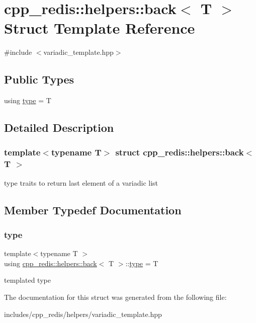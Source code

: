 \hypertarget{structcpp__redis_1_1helpers_1_1back_3_01_t_01_4}{}\section{cpp\+\_\+redis\+:\+:helpers\+:\+:back$<$ T $>$ Struct Template Reference}
\label{structcpp__redis_1_1helpers_1_1back_3_01_t_01_4}


{\ttfamily \#include $<$variadic\+\_\+template.\+hpp$>$}

\subsection*{Public Types}
\begin{DoxyCompactItemize}
\item 
using \mbox{\hyperlink{structcpp__redis_1_1helpers_1_1back_3_01_t_01_4_a87d10cfacd8ca29b083dc5688e77f87c}{type}} = T
\end{DoxyCompactItemize}


\subsection{Detailed Description}
\subsubsection*{template$<$typename T$>$\newline
struct cpp\+\_\+redis\+::helpers\+::back$<$ T $>$}

type traits to return last element of a variadic list 

\subsection{Member Typedef Documentation}
\mbox{\label{structcpp__redis_1_1helpers_1_1back_3_01_t_01_4_a87d10cfacd8ca29b083dc5688e77f87c}} 
\subsubsection{\texorpdfstring{type}{type}}
{\footnotesize\ttfamily template$<$typename T $>$ \\
using \mbox{\hyperlink{structcpp__redis_1_1helpers_1_1back}{cpp\+\_\+redis\+::helpers\+::back}}$<$ T $>$\+::\mbox{\hyperlink{structcpp__redis_1_1helpers_1_1back_3_01_t_01_4_a87d10cfacd8ca29b083dc5688e77f87c}{type}} =  T}

templated type 

The documentation for this struct was generated from the following file\+:\begin{DoxyCompactItemize}
\item 
includes/cpp\+\_\+redis/helpers/variadic\+\_\+template.\+hpp\end{DoxyCompactItemize}
